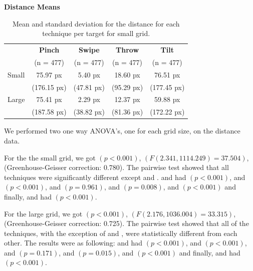 \begin{table}[H]
	\centering
	\textbf{Distance Means}\\[4pt]
	\begin{adjustbox}{width=\columnwidth}
	\begin{tabular}{|c|c|c|c|c|}
		\hline
		\rowcolor[HTML]{9B9B9B} 
		& \textbf{Pinch} & \textbf{Swipe} & \textbf{Throw} & \textbf{Tilt} \\
		\rowcolor[HTML]{9B9B9B} 
		& (n = 477) & (n = 477) & (n = 477) & (n = 477) \\ \hline
		Small & 75.97 px & 5.40 px & 18.60 px  & 76.51 px         \\
		& (176.15 px) & (47.81 px) & (95.29 px) & (177.45 px) \\ \hline
		Large & 75.41 px & 2.29 px & 12.37 px & 59.88 px         \\
		& (187.58 px) & (38.82 px) & (81.36 px) & (172.22 px) \\ \hline
	\end{tabular}
	\end{adjustbox}
	\caption{Mean and standard deviation for the distance for each technique per target for small grid.}
	\label{tab:distance}
\end{table}

We performed two one way ANOVA's, one for each grid size, on the distance data.

For the the small grid, we got $(p<0.001)$, $(F(2.341, 1114.249)=37.504)$, (Greenhouse-Geisser correction: 0.780).
The pairwise test showed that all techniques were significantly different except \pinch and \tilt. 
\pinch and \swipe had $(p < 0.001)$, 
\pinch and \throw $(p <0.001)$, 
\pinch and \tilt $(p = 0.961)$, 
\swipe and \throw $(p = 0.008)$, 
\swipe and \tilt $(p < 0.001)$ and finally, 
\throw and \tilt had $(p < 0.001)$. 

For the large grid, we got $(p<0.001)$, $(F(2.176, 1036.004)=33.315)$, (Greenhouse-Geisser correction: 0.725).
The pairwise test showed that all of the techniques, with the exception of \pinch and \tilt, were statistically different from each other. The results were as following: 
\pinch and \swipe had $(p < 0.001)$, 
\pinch and \throw $(p <0.001)$, 
\pinch and \tilt $(p = 0.171)$, 
\swipe and \throw $(p = 0.015)$, 
\swipe and \tilt $(p < 0.001)$ and finally, 
\throw and \tilt had $(p < 0.001)$. 

